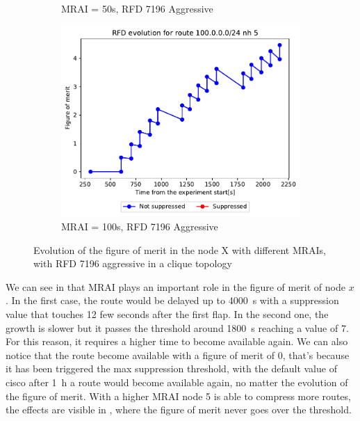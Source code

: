 \begin{figure}[h]
\begin{subfigure}[b]{0.49\textwidth}
         \caption{MRAI = 50s, RFD 7196 Aggressive}
         \label{fig:clique_x_mrai50_rfd7196Aggressive}
     \end{subfigure}
     \begin{subfigure}[b]{0.49\textwidth}
         \centering
         \includegraphics[width=\textwidth]{images/RFD/clique/FigureOfMerit/mrai21_RFD_7196_aggressive_x_rfd_R1.pdf}
         \caption{MRAI = 100s, RFD 7196 Aggressive}
         \label{fig:clique_x_mrai100_rfd7196Aggressive}
     \end{subfigure}
        \caption{Evolution of the figure of merit in the node X with different
				MRAIs, with RFD 7196 aggressive in a clique topology}
        \label{fig:clique_nodex_rfd7196Aggressive}
\end{figure}

We can see in 
that \ac{MRAI} plays an important role in the figure of merit of node $x$.
In the first case, the route would be delayed up to \SI{4000}{\second} with a
suppression value that touches \num{12} few seconds after the first flap.
In the second one, the growth is slower but it passes the threshold around
\SI{1800}{\second} reaching a value of \num{7}.
For this reason, it requires a higher time to become available again.
We can also notice that the route become available with a figure of merit of
\num{0}, that's because it has been triggered the max suppression threshold,
with the default value of cisco after \SI{1}{\hour} a route would become available
again, no matter the evolution of the figure of merit.
With a higher \ac{MRAI} node \num{5} is able to compress more routes, the effects
are visible in , where the figure of
merit never goes over the threshold.


